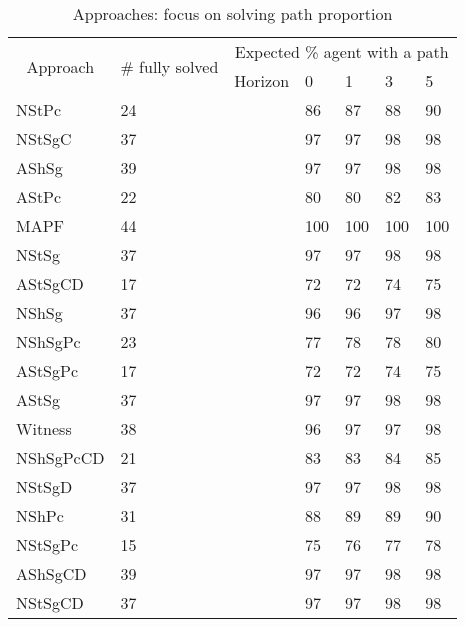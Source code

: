 \begin{table}[H]
\begin{center}
\caption{Approaches: focus on solving path proportion}
\label{tbl:path_proportion}
\begin{tabular}{@{}lllllll@{}}
\toprule
 \multicolumn{1}{c}{\multirow{2}{*}{Approach}} & \multirow{2}{*}{\# fully solved} & \multicolumn{5}{c}{Expected \% agent with a path} \\ \cmidrule(l){3-7}  
\multicolumn{1}{c}{} &  & \multicolumn{1}{l|}{Horizon} & 0 & 1 & 3 & 5 \\ \midrule
NStPc & 24 & \cellcolor{lightgrey} & 86 & 87 & 88 & 90  \\
NStSgC & 37 & \cellcolor{lightgrey} & 97 & 97 & 98 & 98  \\
AShSg & 39 & \cellcolor{lightgrey} & 97 & 97 & 98 & 98  \\
AStPc & 22 & \cellcolor{lightgrey} & 80 & 80 & 82 & 83  \\
MAPF & 44 & \cellcolor{lightgrey} & 100 & 100 & 100 & 100  \\
NStSg & 37 & \cellcolor{lightgrey} & 97 & 97 & 98 & 98  \\
AStSgCD & 17 & \cellcolor{lightgrey} & 72 & 72 & 74 & 75  \\
NShSg & 37 & \cellcolor{lightgrey} & 96 & 96 & 97 & 98  \\
NShSgPc & 23 & \cellcolor{lightgrey} & 77 & 78 & 78 & 80  \\
AStSgPc & 17 & \cellcolor{lightgrey} & 72 & 72 & 74 & 75  \\
AStSg & 37 & \cellcolor{lightgrey} & 97 & 97 & 98 & 98  \\
Witness & 38 & \cellcolor{lightgrey} & 96 & 97 & 97 & 98  \\
NShSgPcCD & 21 & \cellcolor{lightgrey} & 83 & 83 & 84 & 85  \\
NStSgD & 37 & \cellcolor{lightgrey} & 97 & 97 & 98 & 98  \\
NShPc & 31 & \cellcolor{lightgrey} & 88 & 89 & 89 & 90  \\
NStSgPc & 15 & \cellcolor{lightgrey} & 75 & 76 & 77 & 78  \\
AShSgCD & 39 & \cellcolor{lightgrey} & 97 & 97 & 98 & 98  \\
NStSgCD & 37 & \cellcolor{lightgrey} & 97 & 97 & 98 & 98  \\
\end{tabular}
\end{center}
\end{table}
